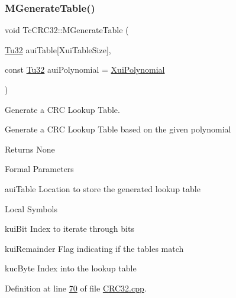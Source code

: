 \subsubsection{\texorpdfstring{M\+Generate\+Table()}{MGenerateTable()}}
{\footnotesize\ttfamily void Tc\+C\+R\+C32\+::\+M\+Generate\+Table (\begin{DoxyParamCaption}\item[{\mbox{\hyperlink{namespace_g_n_common_a941b527ef318f318aed7903dc832b7e4}{Tu32}}}]{aui\+Table\mbox{[}\+Xui\+Table\+Size\mbox{]},  }\item[{const \mbox{\hyperlink{namespace_g_n_common_a941b527ef318f318aed7903dc832b7e4}{Tu32}}}]{aui\+Polynomial = {\ttfamily \mbox{\hyperlink{class_g_n_common_1_1_n_data_authentication_1_1_tc_c_r_c32_ab4394051ff10830de29fa62cbb6f1490}{Xui\+Polynomial}}} }\end{DoxyParamCaption})}



Generate a C\+RC Lookup Table. 

Generate a C\+RC Lookup Table based on the given polynomial

\begin{DoxyReturn}{Returns}
None
\end{DoxyReturn}
\begin{DoxyParagraph}{Formal Parameters}

\begin{DoxyPre}{\ttfamily [ out ]  auiTable    Location to store the generated lookup table }\end{DoxyPre}

\end{DoxyParagraph}
\begin{DoxyParagraph}{Local Symbols}

\begin{DoxyPre}{\ttfamily  kuiBit          Index to iterate through bits }\end{DoxyPre}
 
\begin{DoxyPre}{\ttfamily  kuiRemainder    Flag indicating if the tables match }\end{DoxyPre}
 
\begin{DoxyPre}{\ttfamily  kucByte         Index into the lookup table }\end{DoxyPre}
 
\end{DoxyParagraph}


Definition at line \mbox{\hyperlink{_c_r_c32_8cpp_source_l00070}{70}} of file \mbox{\hyperlink{_c_r_c32_8cpp_source}{C\+R\+C32.\+cpp}}.



